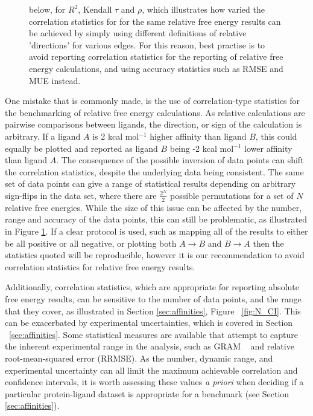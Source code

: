 \documentclass[9pt,bestpractices]{livecoms}
\begin{document}
\begin{figure}
{below, for $R^2$, Kendall $\tau$ and $\rho$, which illustrates how varied the correlation statistics for for the same relative free energy results can be achieved by simply using different definitions of relative 'directions' for various edges. For this reason, best practise is to avoid reporting correlation statistics for the reporting of relative free energy calculations, and using accuracy  statistics such as RMSE and MUE instead.}
    \label{fig:changing-corr}
\end{figure}

One mistake that is commonly made, is the use of correlation-type statistics for the benchmarking of relative free energy calculations. As relative calculations are pairwise comparisons between ligands, the direction, or sign of the calculation is arbitrary. If a ligand $A$ is 2 kcal mol$^{-1}$ higher affinity than ligand $B$, this could equally be plotted and reported as ligand $B$ being -2 kcal mol$^{-1}$ lower affinity than ligand $A$. The consequence of the possible inversion of data points can shift the correlation statistics, despite the underlying data being consistent. The same set of data points can give a range of statistical results depending on arbitrary sign-flips in the data set, where there are $\frac{2^N}{2}$ possible permutations for a set of $N$ relative free energies. While the size of this issue can be affected by the number, range and accuracy of the data points, this can still be problematic, as illustrated in Figure \ref{fig:changing-corr}. If a clear protocol is used, such as mapping all of the results to either be all positive or all negative, or plotting both $A \rightarrow B$ and $B \rightarrow A$ then the statistics quoted will be reproducible, however it is our recommendation to avoid correlation statistics for relative free energy results.

Additionally, correlation statistics, which are appropriate for reporting absolute free energy results, can be sensitive to the number of data points, and the range that they cover, as illustrated in Section \ref{sec:affinities}, Figure ~\ref{fig:N_CI}. This can be exacerbated by experimental uncertainties, which is covered in Section ~\ref{sec:affinities}. Some statistical measures are available that attempt to capture the inherent experimental range in the analysis, such as GRAM ~\cite{cui2019gram} and relative root-mean-squared error (RRMSE). As the number, dynamic range, and experimental uncertainty can all limit the maximum achievable correlation and confidence intervals, it is worth assessing these values \textit{a priori} when deciding if a particular protein-ligand dataset is appropriate for a benchmark (see Section \ref{sec:affinities}).
\end{document}

